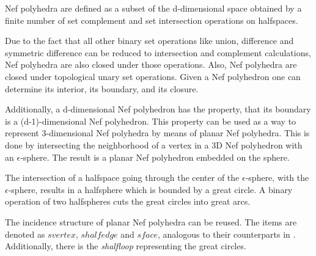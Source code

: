 
\clearpage
{}
\label{chapterNefpolyhedronRef}



Nef polyhedra are defined as a subset of the d-dimensional space obtained by
a finite number of set complement and set intersection operations on
halfspaces. 

Due to the fact that all other binary set operations like union,
difference and symmetric difference can be reduced to intersection and
complement calculations, Nef polyhedra are also closed under those
operations. Also, Nef polyhedra are closed under topological unary 
set operations. Given a Nef polyhedron one can determine its interior, its
boundary, and its closure.

Additionally, a d-dimensional Nef polyhedron has the property, that its boundary
is a (d-1)-dimensional Nef polyhedron. This property can be used as a way to
represent 3-dimensional Nef polyhedra by means of planar Nef polyhedra.
This is done by intersecting the neighborhood of a vertex in a 3D Nef polyhedron
with an $\epsilon$-sphere. The result is a planar Nef polyhedron embedded
on the sphere.

The intersection of a halfspace going through the center of the $\epsilon$-sphere,
with the $\epsilon$-sphere, results in a halfsphere which is bounded by
a great circle. A binary operation of two halfspheres cuts the great circles
into great arcs.

The incidence structure of planar Nef polyhedra can be reused. The items
are denoted as $svertex$, $shalfedge$ and $sface$, analogous 
to their counterparts in . Additionally, there is the
\emph{shalfloop} representing the great circles.

%

